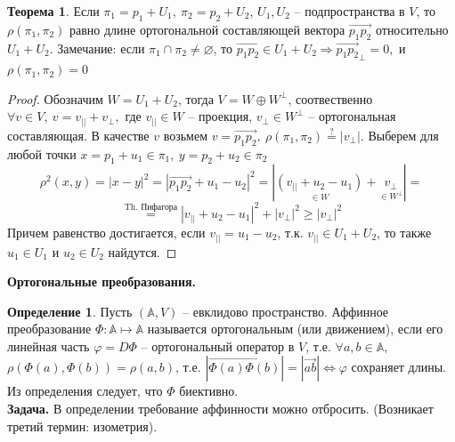 \documentclass[a4paper, 12pt]{article}
\theoremstyle{definition}
\newtheorem*{definition}{Определение}
\newtheorem*{theorem}{Теорема}
\begin{document}
    \begin{theorem}
        Если $\pi_1 = p_1 + U_1,\ \pi_2 = p_2 + U_2$, 
        $U_1,U_2$ -- подпространства в $V$, то $\rho(\pi_1,
        \pi_2)$ равно длине ортогональной составляющей вектора 
        $\overrightarrow{p_1p_2}$ относительно $U_1 + U_2$.
        Замечание: если $\pi_1 \cap \pi_2 \neq \varnothing$,
        то $\overrightarrow{p_1p_2} \in U_1 + U_2 
        \Longrightarrow \overrightarrow{p_1p_2}_\perp = 0,$ 
        и $\rho(\pi_1, \pi_2) = 0$ 
    \end{theorem}
    \begin{proof}
        Обозначим $W = U_1 + U_2$, тогда $V = W \oplus 
        W^\perp$, соотвественно $\forall v \in V,\ v = v_{||}  
        + v_\perp,$ где $v_{||} \in W$ -- проекция, 
        $v_\perp \in W^\perp$ -- ортогональная составляющая.
        В качестве $v$ возьмем $v = \overrightarrow{p_1p_2},
        \ \rho(\pi_1,\pi_2) \overset{?}{=} |v_\perp|$. 
        Выберем для любой точки $x = p_1 + u_1 \in \pi_1,\ 
        y = p_2 + u_2 \in \pi_2$
        $$\rho^2(x,y) = |x - y|^2 = |\overrightarrow{p_1p_2} +
        u_1 - u_2|^2 = |\underset{\in W}{(v_{||} + u_2 - u_1)}+ 
        \underset{\in W^\perp}{v_\perp}| = $$
        $$\overset{\text{Th. Пифагора}}{=} |v_{||} + u_2 - u_1|
        ^2 + |v_\perp|^2 \geq |v_\perp|
        ^2$$
        Причем равенство достигается, если $v_{||} = u_1 - 
        u_2$, т.к. $v_{||} \in U_1 + U_2$, то также $u_1 \in 
        U_1$ и $u_2 \in U_2$ найдутся. 

    \end{proof}
    \begin{center}
        \textbf{Ортогональные преобразования.} 
    \end{center}
    \begin{definition}
        Пусть $(\mathbb{A}, V)$ -- евклидово пространство. 
        Аффинное преобразование $\Phi:\mathbb{A} \longmapsto 
        \mathbb{A}$ называется ортогональным (или движением),
        если его линейная часть $\varphi = D \Phi$ -- 
        ортогональный оператор в $V$, т.е. $\forall a,b \in 
        \mathbb{A}$, $\rho(\Phi(a), \Phi(b)) = \rho(a, b)$,
        т.е. $|\overrightarrow{\Phi(a)\Phi(b)}| = |
        \overrightarrow{ab}| \Longleftrightarrow \varphi$ 
        сохраняет длины.\\
        Из определения следует, что $\Phi$ биективно.\\
        \textbf{Задача.} В определении требование аффинности 
        можно отбросить. (Возникает третий термин: изометрия). 

    \end{definition}
\end{document}
